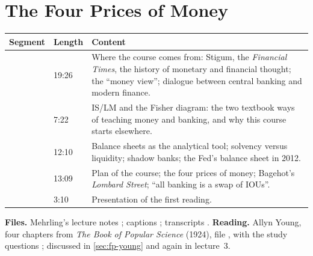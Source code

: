 \chapter{The Four Prices of Money}\label{ch:fourprices}
\begin{paracol}{2}

\begin{sources}
\begin{tabularx}{\linewidth}{@{}l l L@{}}
\toprule
\textbf{Segment} & \textbf{Length} & \textbf{Content}\\
\midrule
{} & 19:26 & Where the course comes from: Stigum, the \emph{Financial Times}, the history of monetary and financial thought; the ``money view''; dialogue between central banking and modern finance.\\
 & 7:22 & IS/LM and the Fisher diagram: the two textbook ways of teaching money and banking, and why this course starts elsewhere.\\
 & 12:10 & Balance sheets as the analytical tool; solvency versus liquidity; shadow banks; the Fed's balance sheet in 2012.\\
 & 13:09 & Plan of the course; the four prices of money; Bagehot's \emph{Lombard Street}; ``all banking is a swap of IOUs''.\\
 & 3:10 & Presentation of the first reading.\\
\bottomrule
\end{tabularx}

\smallskip
\textbf{Files.} Mehrling's lecture notes  ;
captions ; transcripts .
\textbf{Reading.} Allyn Young, four chapters from \emph{The Book of Popular Science} (1924), file
, with the study questions ; discussed in
\cref{sec:fp-young} and again in lecture~3.
\end{sources}


\end{paracol}
